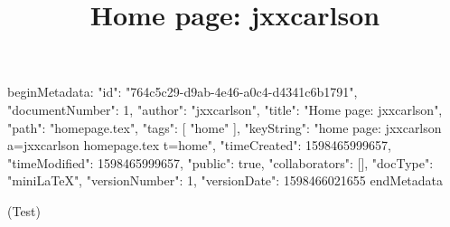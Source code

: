 beginMetadata:
{
    "id": "764c5c29-d9ab-4e46-a0c4-d4341c6b1791",
    "documentNumber": 1,
    "author": "jxxcarlson",
    "title": "Home page: jxxcarlson",
    "path": "homepage.tex",
    "tags": [
        "home"
    ],
    "keyString": "home page: jxxcarlson a=jxxcarlson homepage.tex t=home",
    "timeCreated": 1598465999657,
    "timeModified": 1598465999657,
    "public": true,
    "collaborators": [],
    "docType": "miniLaTeX",
    "versionNumber": 1,
    "versionDate": 1598466021655
}
endMetadata
\title{Home page: jxxcarlson}

\maketitle

(Test)



\bigskip

